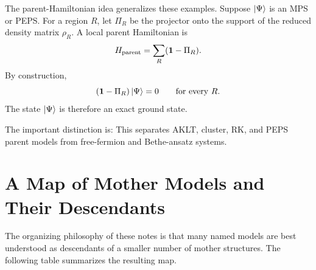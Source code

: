 The parent-Hamiltonian idea generalizes these examples.  Suppose \(\left|\Psi\right\rangle\) is an MPS or PEPS.  For a region \(R\), let \(\Pi_R\) be the projector onto the support of the reduced density matrix \(\rho_R\).  A local parent Hamiltonian is
\begin{equation}
\label{eq:conclusion-parent-hamiltonian}
    H_{\rm parent}
    =
    \sum_R (\mathbf{1}-\Pi_R).
\end{equation}
By construction,
\begin{equation}
\label{eq:conclusion-parent-annihilation}
    (\mathbf{1}-\Pi_R)\left|\Psi\right\rangle=0
    \qquad
    \text{for every }R.
\end{equation}
The state \(\left|\Psi\right\rangle\) is therefore an exact ground state.

The important distinction is:
This separates AKLT, cluster, RK, and PEPS parent models from free-fermion and Bethe-ansatz systems.

\section{A Map of Mother Models and Their Descendants}
\label{sec:mother-model-map-conclusion}

The organizing philosophy of these notes is that many named models are best understood as descendants of a smaller number of mother structures.  The following table summarizes the resulting map.

